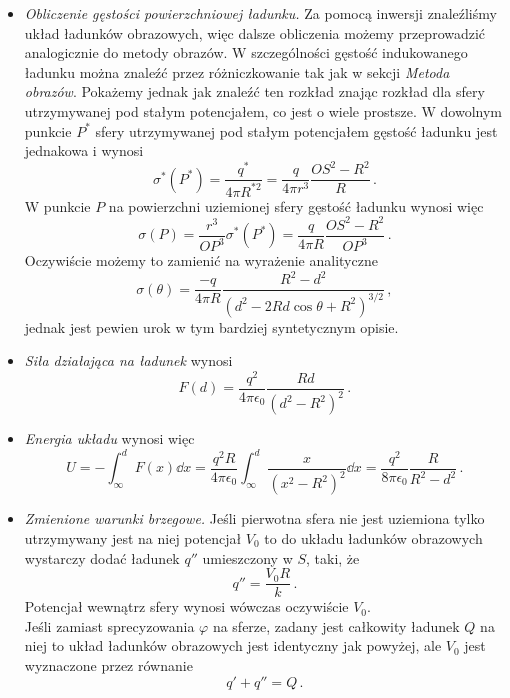 \documentclass[../main.tex]{subfiles}
\begin{document}
\begin{enumerate}
\begin{itemize}
        \item\textit{Obliczenie gęstości powierzchniowej ładunku.} Za pomocą inwersji znaleźliśmy układ ładunków obrazowych, więc dalsze obliczenia możemy przeprowadzić analogicznie do metody obrazów. W szczególności gęstość indukowanego ładunku można znaleźć przez różniczkowanie tak jak w sekcji \textit{Metoda obrazów}. Pokażemy jednak jak znaleźć ten rozkład znając rozkład dla sfery utrzymywanej pod stałym potencjałem, co jest o wiele prostsze. W dowolnym punkcie \(P^*\) sfery utrzymywanej pod stałym potencjałem gęstość ładunku jest jednakowa i wynosi
        \begin{equation*}
            \sigma^*(P^*)=\frac{q^*}{4\pi R^{*2}}=\frac{q}{4\pi r^3}\frac{OS^2-R^2}{R}\,.
        \end{equation*}
        W punkcie \(P\) na powierzchni uziemionej sfery gęstość ładunku wynosi więc
        \begin{equation*}
            \sigma(P)=\frac{r^3}{OP^3}\sigma^*(P^*)=\frac{q}{4\pi R}\frac{OS^2-R^2}{OP^3}\,.
        \end{equation*}
        Oczywiście możemy to zamienić na wyrażenie analityczne
        \begin{equation*}
            \sigma(\theta)=\frac{-q}{4\pi R}\frac{R^2-d^2}{(d^2-2Rd\cos\theta+R^2)^{3/2}}\,,
        \end{equation*}
        jednak jest pewien urok w tym bardziej syntetycznym opisie.
        \item \textit{Siła działająca na ładunek} wynosi
        \begin{equation*}
            F(d)=\frac{q^2}{4\pi\epsilon_0}\frac{Rd}{(d^2-R^2)^2}\,.
        \end{equation*}
        \item \textit{Energia układu} wynosi więc
        \begin{equation*}
            U=-\int_\infty^d F(x)\dd{x}=\frac{q^2R}{4\pi\epsilon_0}\int_\infty^d\frac{x}{(x^2-R^2)^2}\dd{x}=\frac{q^2}{8\pi\epsilon_0}\frac{R}{R^2-d^2}\,.
        \end{equation*}
        \item \textit{Zmienione warunki brzegowe.} Jeśli pierwotna  sfera nie jest uziemiona tylko utrzymywany jest na niej potencjał \(V_0\) to do układu ładunków obrazowych wystarczy dodać ładunek \(q''\) umieszczony w \(S\), taki, że
        \begin{equation*}
            q''=\frac{V_0R}{k}\,.
        \end{equation*}
        Potencjał wewnątrz sfery wynosi wówczas oczywiście \(V_0\).\\
        Jeśli zamiast sprecyzowania \(\varphi\) na sferze, zadany jest całkowity ładunek \(Q\) na niej to układ ładunków obrazowych jest identyczny jak powyżej, ale \(V_0\) jest wyznaczone przez równanie
        \begin{equation*}
            q'+q''=Q\,.
        \end{equation*}
    \end{itemize}
    

\end{enumerate}
\end{document}
